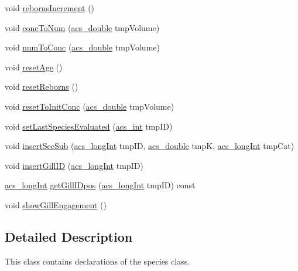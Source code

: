 \begin{DoxyCompactItemize}
\item 
void \hyperlink{a00022_a90d5fc1d90637f2245e8b0ecf228ddfa}{reborns\-Increment} ()
\item 
void \hyperlink{a00022_a9842732a5dbe0eb67e24148b5d7ae4a2}{conc\-To\-Num} (\hyperlink{a00072_ab776853a005fcbf56af0424a2a4dd607}{acs\-\_\-double} tmp\-Volume)
\item 
void \hyperlink{a00022_a23c19a53390142ba690d0f3db0520d05}{num\-To\-Conc} (\hyperlink{a00072_ab776853a005fcbf56af0424a2a4dd607}{acs\-\_\-double} tmp\-Volume)
\item 
void \hyperlink{a00022_a911d4db36e84690d19abb2902a734524}{reset\-Age} ()
\item 
void \hyperlink{a00022_a4884d8bce59ddb79e87e08f3ed16633f}{reset\-Reborns} ()
\item 
void \hyperlink{a00022_acc180a103e6681da2add266aafda3eb9}{reset\-To\-Init\-Conc} (\hyperlink{a00072_ab776853a005fcbf56af0424a2a4dd607}{acs\-\_\-double} tmp\-Volume)
\item 
void \hyperlink{a00022_a8daa007da55f042b9c436f956836f4d8}{set\-Last\-Species\-Evaluated} (\hyperlink{a00072_a8d277355641a098190360234e2ebde35}{acs\-\_\-int} tmp\-I\-D)
\item 
void \hyperlink{a00022_a0da8d53a216583f7790b12362da376a3}{insert\-Sec\-Sub} (\hyperlink{a00072_a19319d75f02db4308bc5c0026d98cd85}{acs\-\_\-long\-Int} tmp\-I\-D, \hyperlink{a00072_ab776853a005fcbf56af0424a2a4dd607}{acs\-\_\-double} tmp\-K, \hyperlink{a00072_a19319d75f02db4308bc5c0026d98cd85}{acs\-\_\-long\-Int} tmp\-Cat)
\item 
void \hyperlink{a00022_aeca516fc712a2bfa19ec560961ed03f7}{insert\-Gill\-I\-D} (\hyperlink{a00072_a19319d75f02db4308bc5c0026d98cd85}{acs\-\_\-long\-Int} tmp\-I\-D)
\item 
\hyperlink{a00072_a19319d75f02db4308bc5c0026d98cd85}{acs\-\_\-long\-Int} \hyperlink{a00022_a1a5c93a3fd5a2605d5e2fd14d29b97cd}{get\-Gill\-I\-Dpos} (\hyperlink{a00072_a19319d75f02db4308bc5c0026d98cd85}{acs\-\_\-long\-Int} tmp\-I\-D) const 
\item 
void \hyperlink{a00022_a211914e1702d47eb3203730fec2c7b4c}{show\-Gill\-Engagement} ()
\end{DoxyCompactItemize}


\subsection{Detailed Description}
This class contains declarations of the species class. 

